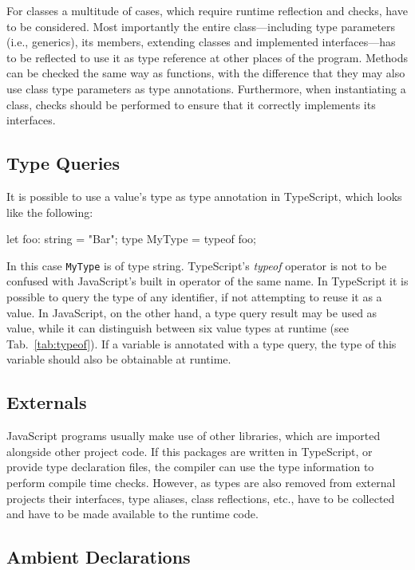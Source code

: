 For classes a multitude of cases, which require runtime reflection and checks, have to be considered. Most importantly the entire class---including type parameters (i.e., generics), its members, extending classes and implemented interfaces---has to be reflected to use it as type reference at other places of the program. Methods can be checked the same way as functions, with the difference that they may also use class type parameters as type annotations. Furthermore, when instantiating a class, checks should be performed to ensure that it correctly implements its interfaces.


\subsection{Type Queries}

It is possible to use a value's type as type annotation in TypeScript, which looks like the following:
\begin{JsCode}[numbers=none]
let foo: string = "Bar";
type MyType = typeof foo;
\end{JsCode}
In this case \texttt{MyType} is of type string. TypeScript's \emph{typeof} operator is not to be confused with JavaScript's built in operator of the same name. In TypeScript it is possible to query the type of any identifier, if not attempting to reuse it as a value. In JavaScript, on the other hand, a type query result may be used as value, while it can distinguish between six value types at runtime (see Tab.~\ref{tab:typeof}). If a variable is annotated with a type query, the type of this variable should also be obtainable at runtime.

\subsection{Externals}

JavaScript programs usually make use of other libraries, which are imported alongside 
other project code. If this packages are written in TypeScript, or provide type declaration files, the compiler can use the type information to perform compile time checks. However, as types are also removed from external projects their interfaces, type aliases, class reflections, etc., have to be collected and have to be made available to the runtime code.

\subsection{Ambient Declarations}

